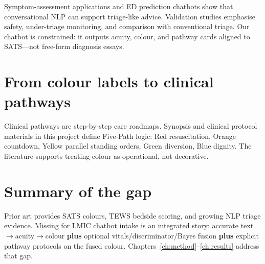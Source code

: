 Symptom-assessment applications and ED prediction chatbots show that conversational NLP can support triage-like advice. Validation studies emphasise safety, under-triage monitoring, and comparison with conventional triage. Our chatbot is constrained: it outputs acuity, colour, and pathway cards aligned to SATS---not free-form diagnosis essays.

\section{From colour labels to clinical pathways}

Clinical pathways are step-by-step care roadmaps. Synopsis and clinical protocol materials in this project define Five-Path logic: Red resuscitation, Orange countdown, Yellow parallel standing orders, Green diversion, Blue dignity. The literature supports treating colour as operational, not decorative.

\section{Summary of the gap}

Prior art provides SATS colours, TEWS bedside scoring, and growing NLP triage evidence. Missing for LMIC chatbot intake is an integrated story: accurate text\(\to\)acuity\(\to\)colour \textbf{plus} optional vitals/discriminator/Bayes fusion \textbf{plus} explicit pathway protocols on the fused colour. Chapters~\ref{ch:method}--\ref{ch:results} address that gap.
